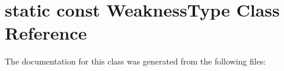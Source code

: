 \hypertarget{classstatic_01const_01WeaknessType}{}\section{static const Weakness\+Type Class Reference}
\label{classstatic_01const_01WeaknessType}


The documentation for this class was generated from the following files\+: